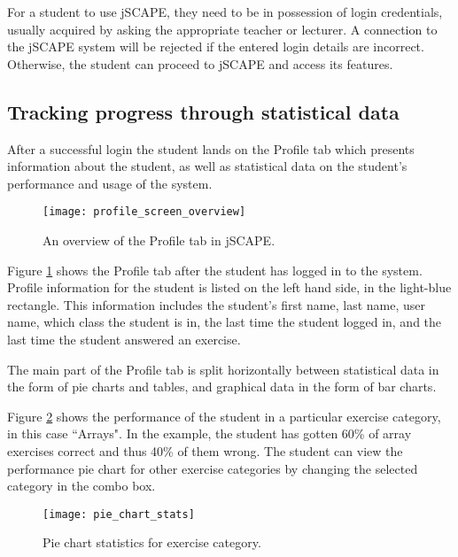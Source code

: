For a student to use jSCAPE, they need to be in possession of login credentials, usually acquired by asking the appropriate teacher or lecturer. A connection to the jSCAPE system will be rejected if the entered login details are incorrect. Otherwise, the student can proceed to jSCAPE and access its features.

\subsection{Tracking progress through statistical data}
\label{subsec:tracking-progress}
After a successful login the student lands on the Profile tab which presents information about the student, as well as statistical data on the student's performance and usage of the system.

\begin{figure}[H]
\centering
\texttt{[image: profile\_screen\_overview]}
\caption{An overview of the Profile tab in jSCAPE.}
\label{fig:profile_screen_overview}
\end{figure}

Figure \ref{fig:profile_screen_overview} shows the Profile tab after the student has logged in to the system. Profile information for the student is listed on the left hand side, in the light-blue rectangle. This information includes the student's first name, last name, user name, which class the student is in, the last time the student logged in, and the last time the student answered an exercise. \newline

The main part of the Profile tab is split horizontally between statistical data in the form of pie charts and tables, and graphical data in the form of bar charts. \newline

Figure \ref{fig:pie_chart_stats1} shows the performance of the student in a particular exercise category, in this case ``Arrays". In the example, the student has gotten 60\% of array exercises correct and thus 40\% of them wrong. The student can view the performance pie chart for other exercise categories by changing the selected category in the combo box.

\begin{figure}[H]
\centering
\texttt{[image: pie\_chart\_stats]}
\caption{Pie chart statistics for exercise category.}
\label{fig:pie_chart_stats1}
\end{figure}

